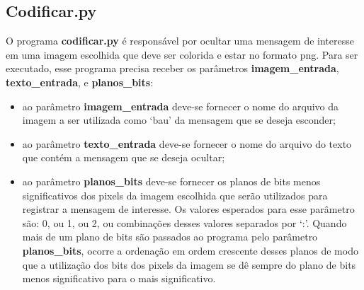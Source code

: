 \documentclass{article}
\begin{document}
\subsection{Codificar.py}
O programa \textbf{codificar.py} é responsável por ocultar uma mensagem de interesse em uma imagem escolhida que deve ser colorida e estar no formato png. Para ser executado, esse programa precisa receber os parâmetros \textbf{imagem\_entrada}, \textbf{texto\_entrada}, e \textbf{planos\_bits}:


\begin{itemize}
	\item ao parâmetro \textbf{imagem\_entrada} deve-se fornecer o nome do arquivo da imagem a ser utilizada como `bau' da mensagem que se deseja esconder;
	\item ao parâmetro \textbf{texto\_entrada} deve-se fornecer o nome do arquivo do texto que contém a mensagem que
	se deseja ocultar;
	\item ao parâmetro \textbf{planos\_bits} deve-se fornecer os planos de bits menos significativos dos pixels da imagem escolhida que serão utilizados para registrar a mensagem de interesse. Os valores esperados para esse parâmetro são: 0, ou 1, ou 2, ou combinações desses valores separados por ‘:’. Quando mais de um plano de bits são passados ao programa pelo parâmetro \textbf{planos\_bits}, ocorre a ordenação em ordem crescente desses planos de modo que a utilização dos bits dos pixels da imagem se dê sempre do plano de bits menos significativo para o mais significativo.
\end{itemize}
\end{document}
